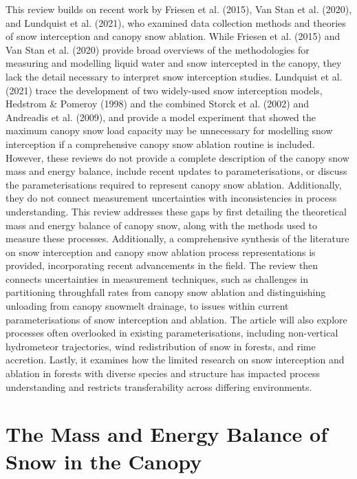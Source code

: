 \documentclass[
  letterpaper,
]{tex/uofsthesis-cs}
\begin{document}
This review builds on recent work by Friesen et al. (2015), Van Stan et
al. (2020), and Lundquist et al. (2021), who examined data collection
methods and theories of snow interception and canopy snow ablation.
While Friesen et al. (2015) and Van Stan et al. (2020) provide broad
overviews of the methodologies for measuring and modelling liquid water
and snow intercepted in the canopy, they lack the detail necessary to
interpret snow interception studies. Lundquist et al. (2021) trace the
development of two widely-used snow interception models, Hedstrom \&
Pomeroy (1998) and the combined Storck et al. (2002) and Andreadis et
al. (2009), and provide a model experiment that showed the maximum
canopy snow load capacity may be unnecessary for modelling snow
interception if a comprehensive canopy snow ablation routine is
included. However, these reviews do not provide a complete description
of the canopy snow mass and energy balance, include recent updates to
parameterisations, or discuss the parameterisations required to
represent canopy snow ablation. Additionally, they do not connect
measurement uncertainties with inconsistencies in process understanding.
This review addresses these gaps by first detailing the theoretical mass
and energy balance of canopy snow, along with the methods used to
measure these processes. Additionally, a comprehensive synthesis of the
literature on snow interception and canopy snow ablation process
representations is provided, incorporating recent advancements in the
field. The review then connects uncertainties in measurement techniques,
such as challenges in partitioning throughfall rates from canopy snow
ablation and distinguishing unloading from canopy snowmelt drainage, to
issues within current parameterisations of snow interception and
ablation. The article will also explore processes often overlooked in
existing parameterisations, including non-vertical hydrometeor
trajectories, wind redistribution of snow in forests, and rime
accretion. Lastly, it examines how the limited research on snow
interception and ablation in forests with diverse species and structure
has impacted process understanding and restricts transferability across
differing environments.

\section{The Mass and Energy Balance of Snow in the
Canopy}\label{sec-theory}
\end{document}
